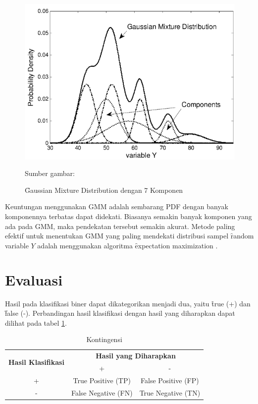   \begin{figure}
    \centering
    \includegraphics[width=\linewidth]{pics/gmm}
    \caption{\f{Gaussian Mixture Distribution} dengan 7 Komponen}{Sumber gambar: \cite{6235282}}
    \label{fig:gmm}
  \end{figure}

  Keuntungan menggunakan GMM adalah sembarang PDF dengan banyak komponennya terbatas dapat didekati. Biasanya semakin banyak komponen yang ada pada GMM, maka pendekatan tersebut semakin akurat. Metode paling efektif untuk menentukan GMM yang paling mendekati distribusi sampel \f{random variable} $Y$ adalah menggunakan algoritma \f{expectation maximization} \citep{singh2010statistical}.


\section{Evaluasi} \label{chap:evaluasi}
Hasil pada klasifikasi biner dapat dikategorikan menjadi dua, yaitu \f{true} (+) dan \f{false} (-). Perbandingan hasil klasifikasi dengan hasil yang diharapkan dapat dilihat pada tabel \ref{table:kontingensi}.

\begin{table}
  \centering
  \caption{Kontingensi}
  \begin{tabular}{|c|c|c|}
    \hline
    \multirow{2}{7em}{\textbf{Hasil Klasifikasi}} & \multicolumn{2}{c|}{\textbf{Hasil yang Diharapkan}} \\
    \cline{2-3}
    & + & - \\
    \hline
    + & True Positive (TP) & False Positive (FP) \\
    \hline
    - & False Negative (FN) & True Negative (TN) \\
    \hline
  \end{tabular}
  \label{table:kontingensi}
\end{table}

